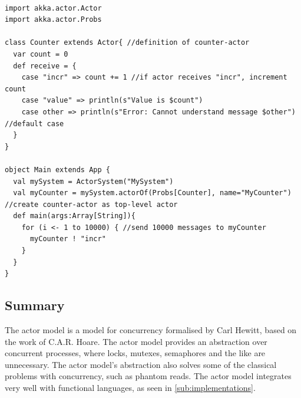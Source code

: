 \begin{lstlisting}[style = scala, caption={A simple message-counter in Scala.}, label=lst:AkkExample]

import akka.actor.Actor
import akka.actor.Probs

class Counter extends Actor{ //definition of counter-actor
  var count = 0
  def receive = {
    case "incr" => count += 1 //if actor receives "incr", increment count
    case "value" => println(s"Value is $count")
    case other => println(s"Error: Cannot understand message $other") //default case
  }
}

object Main extends App {
  val mySystem = ActorSystem("MySystem")
  val myCounter = mySystem.actorOf(Probs[Counter], name="MyCounter") //create counter-actor as top-level actor
  def main(args:Array[String]){
    for (i <- 1 to 10000) { //send 10000 messages to myCounter
      myCounter ! "incr"
    }
  }
}
\end{lstlisting}

\subsection{Summary}
The actor model is a model for concurrency formalised by Carl Hewitt, based on the work of C.A.R. Hoare. The actor model provides an abstraction over concurrent processes, where locks, mutexes, semaphores and the like are unnecessary. The actor model's abstraction also solves some of the classical problems with concurrency, such as phantom reads. The actor model integrates very well with functional languages, as seen in \cref{sub:implementations}.
